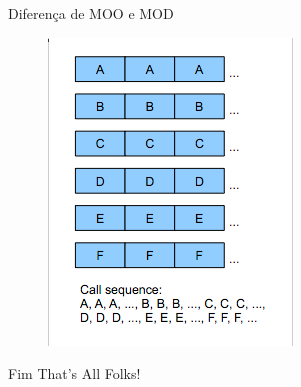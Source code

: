 \documentclass{beamer}
\begin{document}
\begin{frame}[t]{Diferença de MOO e MOD}
\begin{figure}
\begin{minipage}[b]{0.35\textwidth}
            \includegraphics[width=\textwidth]{figuras/dodreadingorder}
        \end{minipage}
    \end{figure}
\end{frame}

\begin{frame}{Fim}
    \centering
    \LARGE{That's All Folks!}
\end{frame}
\end{document}
